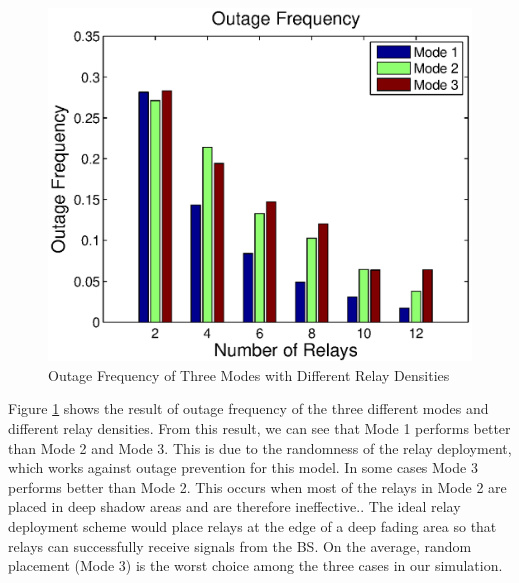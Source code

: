 \begin{figure}
\centering
\includegraphics[width=12cm]{outagefrequency_V2.eps}
\caption{Outage Frequency of Three Modes with Different Relay Densities}
\label{2:outagefrequency}
\end{figure}
Figure \ref{2:outagefrequency} shows the result of outage frequency of the three different modes and different relay densities. From this result, we can see that Mode 1 performs better than Mode 2 and Mode 3. This is due to the randomness of the relay deployment, which works against outage prevention for this model. In some cases Mode 3 performs better than Mode 2. This occurs when most of the relays in Mode 2 are placed in deep shadow areas and are therefore ineffective.. The ideal relay deployment scheme would place relays at the edge of a deep fading area so that relays can successfully receive signals from the BS. On the average, random placement (Mode 3) is the worst choice among the three cases in our simulation.
